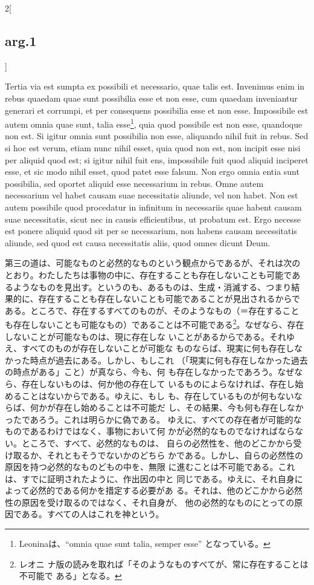 \documentclass[paper=a4paper,fontsize=10pt,jafontsize=9pt,titlepage]{jlreq}
\begin{document}
\begin{paracol}{2}[\subsection{arg.1}]
\switchcolumn*

Tertia via est sumpta ex possibili et necessario, quae talis
est. Invenimus enim in rebus quaedam quae sunt possibilia esse et non
esse, cum quaedam inveniantur generari et corrumpi, et per consequens
possibilia esse et non esse. Impossibile est autem omnia quae sunt,
talia esse\footnote{Leoninaは、``omnia quae sunt talia, semper esse''
となっている。}, quia quod possibile est non esse, quandoque non
est. Si igitur omnia sunt possibilia non esse, aliquando nihil fuit in
rebus. Sed si hoc est verum, etiam nunc nihil esset, quia quod non
est, non incipit esse nisi per aliquid quod est; si igitur nihil fuit
ens, impossibile fuit quod aliquid inciperet esse, et sic modo nihil
esset, quod patet esse falsum. Non ergo omnia entia sunt possibilia,
sed oportet aliquid esse necessarium in rebus. Omne autem necessarium
vel habet causam suae necessitatis aliunde, vel non habet. Non est
autem possibile quod procedatur in infinitum in necessariis quae
habent causam suae necessitatis, sicut nec in causis efficientibus, ut
probatum est. Ergo necesse est ponere aliquid quod sit per se
necessarium, non habens causam necessitatis aliunde, sed quod est
causa necessitatis aliis, quod omnes dicunt Deum.

\switchcolumn

第三の道は、可能なものと必然的なものという観点からであるが、それは次の
とおり。わたしたちは事物の中に、存在することも存在しないことも可能であ
るようなものを見出す。というのも、あるものは、生成・消滅する、つまり結
果的に、存在することも存在しないことも可能であることが見出されるからで
ある。ところで、存在するすべてのものが、そのようなもの（＝存在すること
も存在しないことも可能なもの）であることは不可能である\footnote{レオニ
ナ版の読みを取れば「そのようなものすべてが、常に存在することは不可能で
ある」となる。}。なぜなら、存在しないことが可能なものは、現に存在しな
いことがあるからである。それゆえ、すべてのものが存在しないことが可能な
ものならば、現実に何も存在しなかった時点が過去にある。しかし、もしこれ
（「現実に何も存在しなかった過去の時点がある」こと）が真なら、今も、何
も存在しなかったであろう。なぜなら、存在しないものは、何か他の存在して
いるものによらなければ、存在し始めることはないからである。ゆえに、もし
も、存在しているものが何もないならば、何かが存在し始めることは不可能だ
し、その結果、今も何も存在しなかったであろう。これは明らかに偽である。
ゆえに、すべての存在者が可能的なものであるわけではなく、事物において何
かが必然的なものでなければならない。ところで、すべて、必然的なものは、
自らの必然性を、他のどこかから受け取るか、それともそうでないかのどちら
かである。しかし、自らの必然性の原因を持つ必然的なものどもの中を、無限
に進むことは不可能である。これは、すでに証明されたように、作出因の中と
同じである。ゆえに、それ自身によって必然的である何かを措定する必要があ
る。それは、他のどこかから必然性の原因を受け取るのではなく、それ自身が、
他の必然的なものにとっての原因である。すべての人はこれを神という。


\end{paracol}
\end{document}
